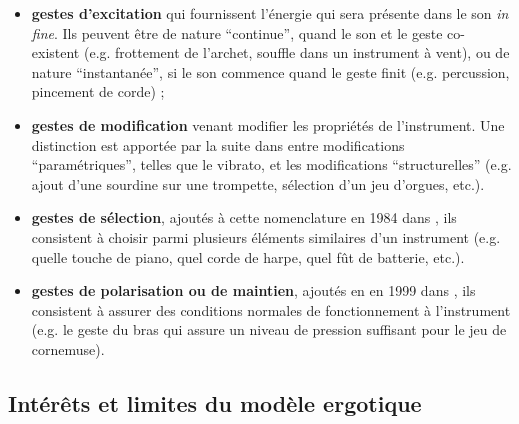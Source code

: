 	\begin{itemize}[noitemsep]
		\item \textbf{gestes d'excitation} qui fournissent l'énergie qui sera présente dans le son \textit{in fine}. Ils peuvent être de nature ``continue'', quand le son et le geste co-existent (e.g. frottement de l'archet, souffle dans un instrument à vent), ou de nature ``instantanée'', si le son commence quand le geste finit (e.g. percussion, pincement de corde) \cite{cadoz_gesture_2000};
		\item \textbf{gestes de modification} venant modifier les propriétés de l'instrument. Une distinction est apportée par la suite dans \cite{cadoz_synthese_1983} entre modifications ``paramétriques'', telles que le vibrato, et les modifications ``structurelles'' (e.g. ajout d'une sourdine sur une trompette, sélection d'un jeu d'orgues, etc.).
		\item \textbf{gestes de sélection}, ajoutés à cette nomenclature en 1984 dans \cite{luciani_modelisation_1984}, ils consistent à choisir parmi plusieurs éléments similaires d'un instrument (e.g. quelle touche de piano, quel corde de harpe, quel fût de batterie, etc.). 
		\item \textbf{gestes de polarisation ou de maintien}, ajoutés en en 1999 dans \cite{cadoz_gesture_2000}, ils consistent à assurer des conditions normales de fonctionnement à l'instrument (e.g. le geste du bras qui assure un niveau de pression suffisant pour le jeu de cornemuse).
\end{itemize}

\subsection{Intérêts et limites du modèle ergotique}

